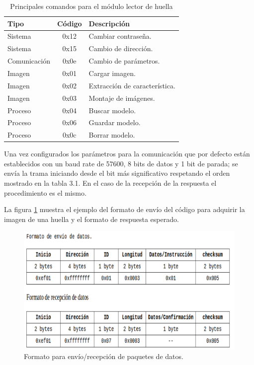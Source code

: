 \begin{table}[h]
	\centering
	\caption[Comandos módulo lector de huellas]{Principales comandos para el módulo lector de huella}
	\begin{tabular}{l c l}    
		\toprule
		\textbf{Tipo}  & \textbf{Código}  & \textbf{Descripción}\\
		\midrule
		Sistema	 	& 0x12 	& Cambiar contraseña.\\		
		Sistema	 	& 0x15 	& Cambio de dirección.\\
		Comunicación & 0x0e & Cambio de parámetros.\\	
		Imagen	 	& 0x01 	& Cargar imagen.\\
		Imagen	 	& 0x02 	& Extracción de característica.\\
		Imagen	 	& 0x03 	& Montaje de imágenes.\\
		Proceso	 	& 0x04 	& Buscar modelo.\\
		Proceso	 	& 0x06 	& Guardar modelo.\\				
		Proceso	 	& 0x0c 	& Borrar  modelo.\\				
		\bottomrule
		\hline
	\end{tabular}
	\label{tab:comandos}
\end{table}

Una vez configurados los parámetros para la comunicación que por defecto están establecidos con un baud rate de 57600, 8 bits de datos y 1 bit de parada; se envía la trama iniciando desde el bit más significativo respetando el orden mostrado en la tabla 3.1.
En el caso de la recepción de la respuesta el procedimiento es el mismo.

La figura \ref{fig:tablasensor} muestra el ejemplo del formato de envío del código para adquirir la imagen de una huella y el formato de respuesta esperado.

\begin{figure}[h]
	\centering
	\includegraphics[scale=.3]{./Figures/tablasensor.png}
	\caption{Formato para envío/recepción de paquetes de datos.}
	\label{fig:tablasensor}
\end{figure}


